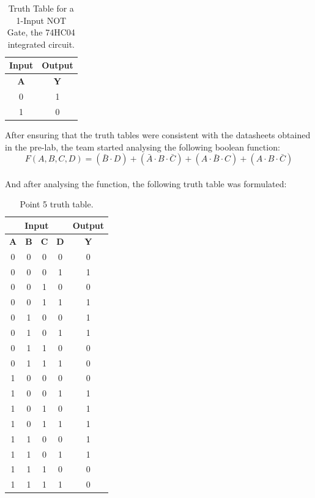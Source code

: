 \documentclass[12pt]{article}  %
\begin{document}
\begin{table}[h!]
\centering
\begin{tabular}{|c|c|}
\hline
\textbf{Input} & \textbf{Output} \\
\hline
\textbf{A} & \textbf{Y} \\
\hline
0 & 1  \\
1 & 0  \\
\hline
\end{tabular}
\caption{Truth Table for a 1-Input NOT Gate, the 74HC04 integrated circuit.}
\label{tab:and_gate}
\end{table}

After ensuring that the truth tables were consistent with the datasheets obtained in the pre-lab, the team started analysing the following boolean function:
$$
F(A, B, C, D) = (\bar{B} \cdot D) + (\bar{A} \cdot B \cdot \bar{C}) + (A \cdot \bar{B} \cdot C) + (A \cdot B \cdot \bar{C})
$$ \\
And after analysing the function, the following truth table was formulated:
\begin{table}[h!]
\centering
\begin{tabular}{|c|c|c|c||c|}
\hline
\multicolumn{4}{|c||}{\textbf{Input}} & \textbf{Output} \\
\hline
\textbf{A} & \textbf{B} & \textbf{C} & \textbf{D} & \textbf{Y} \\
\hline
0 & 0 & 0 & 0 & 0 \\
0 & 0 & 0 & 1 & 1 \\
0 & 0 & 1 & 0 & 0 \\
0 & 0 & 1 & 1 & 1 \\
0 & 1 & 0 & 0 & 1 \\
0 & 1 & 0 & 1 & 1 \\
0 & 1 & 1 & 0 & 0 \\
0 & 1 & 1 & 1 & 0 \\
1 & 0 & 0 & 0 & 0 \\
1 & 0 & 0 & 1 & 1 \\
1 & 0 & 1 & 0 & 1 \\
1 & 0 & 1 & 1 & 1 \\
1 & 1 & 0 & 0 & 1 \\
1 & 1 & 0 & 1 & 1 \\
1 & 1 & 1 & 0 & 0 \\
1 & 1 & 1 & 1 & 0 \\
\hline
\end{tabular}
\caption{Point 5 truth table.}
\label{tab:truth_table_point_5}
\end{table}
\end{document}

